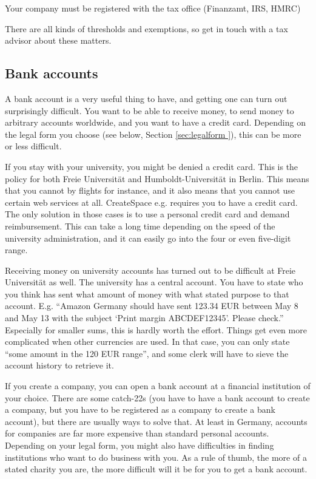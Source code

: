 \documentclass[guidelines,nonflat,modfonts] {langsci/langscibook}
\begin{document}
Your company must be registered with the tax office (Finanzamt, IRS, HMRC)

There are all kinds of thresholds and exemptions, so get in touch with a tax advisor about these matters. 

\subsection{Bank accounts}
A bank account is a very useful thing to have, and getting one can turn out surprisingly difficult. You want to be able to receive money, to send money to arbitrary accounts worldwide, and you want to have a credit card. Depending on the legal form you choose (see below, Section \ref{sec:legalform }), this can be more or less difficult. 

If you stay with your university, you might be denied a credit card. This is the policy for both Freie Universität and Humboldt-Universität in Berlin. This means that you cannot by flights for instance, and it also means that you cannot use certain web services at all. CreateSpace e.g. requires you to have a credit card. The only solution in those cases is to use a personal credit card and demand reimbursement. This can take a long time depending on the speed of the university administration, and it can easily go into the four or even five-digit range. 

Receiving money on university accounts has turned out to be difficult at Freie Universität as well. The university has a central account. You have to state who you think has sent what amount of money with what stated purpose to that account. E.g. ``Amazon Germany should have sent 123.34 EUR between May 8 and May 13 with the subject `Print margin ABCDEF12345'. Please check.'' Especially for smaller sums, this is hardly worth the effort. Things get even more complicated when other currencies are used. In that case, you can only state ``some amount in the 120 EUR range'', and some clerk will have to sieve the account history to retrieve it. 

If you create a company, you can open a bank account at a financial institution of your choice. There are some catch-22s (you have to have a bank account to create a company, but you have to be registered as a company to create a bank account), but there are usually ways to solve that. At least in Germany, accounts for companies are far more expensive than standard personal accounts. Depending on your legal form, you might also have difficulties in finding institutions who want to do business with you. As a rule of thumb, the more of a stated charity you are, the more difficult will it be for you to get a bank account. 
\end{document}
